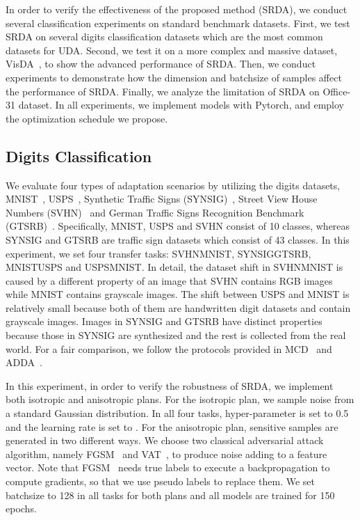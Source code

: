 \documentclass[10pt,twocolumn,letterpaper]{article}
\begin{document}
In order to verify the effectiveness of the proposed method (SRDA), we conduct several classification experiments on standard benchmark datasets. First, we test SRDA on several digits classification datasets which are the most common datasets for UDA. Second, we test it on a more complex and massive dataset, VisDA~\cite{peng2017visda:}, to show the advanced performance of SRDA. Then, we conduct experiments to demonstrate how the dimension and batchsize of samples affect the performance of SRDA. Finally, we analyze the limitation of SRDA on Office-31 dataset. In all experiments, we implement models with Pytorch, and employ the optimization schedule we propose.

\subsection{Digits Classification}

We evaluate four types of adaptation scenarios by utilizing the digits datasets, MNIST~\cite{726791}, USPS~\cite{291440}, Synthetic Traffic Signs (SYNSIG)~\cite{10.1007/978-3-319-02895-8_52}, Street View House Numbers (SVHN)~\cite{37648} and German Traffic Signs Recognition Benchmark (GTSRB)~\cite{6033395}. Specifically, MNIST, USPS and SVHN consist of 10 classes, whereas SYNSIG and GTSRB are traffic sign datasets which consist of 43 classes. In this experiment, we set four transfer tasks: SVHNMNIST, SYNSIGGTSRB, MNISTUSPS and USPSMNIST. In detail, the dataset shift in SVHNMNIST is caused by a different property of an image that SVHN contains RGB images while MNIST contains grayscale images. The shift between USPS and MNIST is relatively small because both of them are handwritten digit datasets and contain grayscale images. Images in SYNSIG and GTSRB have distinct properties because those in SYNSIG are synthesized and the rest is collected from the real world. For a fair comparison, we follow the protocols provided in MCD~\cite{saito2018maximum} and ADDA~\cite{tzeng2017adversarial}.

In this experiment, in order to verify the robustness of SRDA, we implement both isotropic and anisotropic plans. For the isotropic plan, we sample noise from a standard Gaussian distribution. In all four tasks, hyper-parameter  is set to 0.5 and the learning rate is set to . For the anisotropic plan, sensitive samples are generated in two different ways. We choose two classical adversarial attack algorithm, namely FGSM~\cite{goodfellow2014explaining} and VAT~\cite{miyato2018virtual}, to produce noise adding to a feature vector. Note that FGSM~\cite{goodfellow2014explaining} needs true labels to execute a backpropagation to compute gradients, so that we use pseudo labels to replace them. We set batchsize to 128 in all tasks for both plans and all models are trained for 150 epochs.
\end{document}

